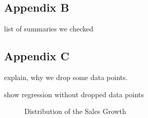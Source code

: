 \documentclass[
]{article}
\begin{document}
\subsection{Appendix B}\label{appendix-b}

list of summaries we checked

\subsection{Appendix C}\label{appendix-c}

explain, why we drop some data points.

show regression without dropped data points

\begin{figure}


\caption{\label{fig-3}Distribution of the Sales Growth}

\end{figure}%
\end{document}
